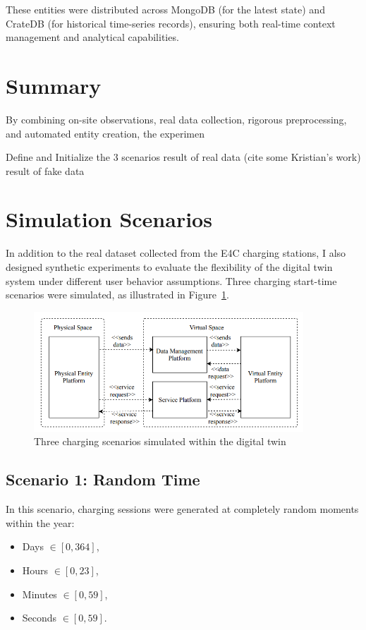 These entities were distributed across MongoDB (for the latest state) and CrateDB (for historical time-series records), ensuring both real-time context management and analytical capabilities.  

\section{Summary}
By combining on-site observations, real data collection, rigorous preprocessing, and automated entity creation, the experimen

Define and Initialize the 3 scenarios
result of real data (cite some Kristian's work)
result of fake data
\section{Simulation Scenarios}

In addition to the real dataset collected from the E4C charging stations, I also designed synthetic experiments to evaluate the flexibility of the digital twin system under different user behavior assumptions.  
Three charging start-time scenarios were simulated, as illustrated in Figure~\ref{fig:charging_scenarios}.

\begin{figure}[ht!]
    \centering
    \includegraphics[width=0.9\textwidth]{Images/DT_diagram.png}
    \caption{Three charging scenarios simulated within the digital twin}
    \label{fig:charging_scenarios}
\end{figure}

\subsection*{Scenario 1: Random Time}
In this scenario, charging sessions were generated at completely random moments within the year:
\begin{itemize}
    \item Days $\in [0,364]$, 
    \item Hours $\in [0,23]$, 
    \item Minutes $\in [0,59]$, 
    \item Seconds $\in [0,59]$. 
\end{itemize}

